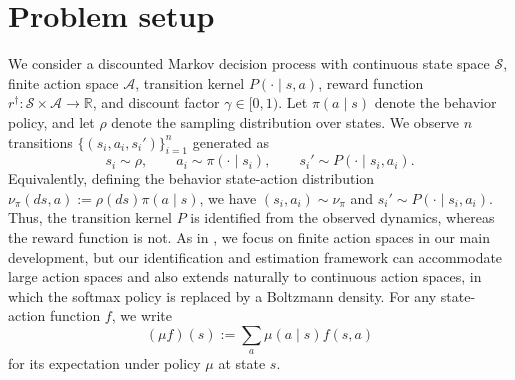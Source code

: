 \documentclass{article}
\newcommand{\1}{\mathbbm{1}}
\newcommand{\calP}{\mathcal{P}}
\newcommand{\calV}{\mathcal{V}}
\begin{document}
 

\section{Problem setup}
\label{sec:background}
We consider a discounted Markov decision process with continuous state space
\(\mathcal S\), finite action space \(\mathcal A\), transition kernel
\(P(\cdot\mid s,a)\), reward function
\(r^\dagger:\mathcal S\times\mathcal A\to\mathbb R\), and discount factor
\(\gamma\in[0,1)\). Let \(\pi(a\mid s)\) denote the behavior policy, and let
\(\rho\) denote the sampling distribution over states. We observe \(n\)
transitions \(\{(s_i,a_i,s_i')\}_{i=1}^n\) generated as
\[
s_i\sim \rho,\qquad
a_i\sim \pi(\cdot\mid s_i),\qquad
s_i'\sim P(\cdot\mid s_i,a_i).
\]
Equivalently, defining the behavior state-action distribution
\(\nu_\pi(ds,a):=\rho(ds)\pi(a\mid s)\), we have \((s_i,a_i)\sim \nu_\pi\)
and \(s_i'\sim P(\cdot\mid s_i,a_i)\). Thus, the transition kernel \(P\) is identified from the observed dynamics,
whereas the reward function is not. As in \citet{geng2020deep}, we focus on finite action spaces in our main
development, but our identification and estimation framework can accommodate
large action spaces and also extends naturally to continuous action spaces, in
which the softmax policy is replaced by a Boltzmann density. For any state-action
function \(f\), we write
\[
(\mu f)(s):=\sum_a \mu(a\mid s)f(s,a)
\]
for its expectation under policy \(\mu\) at state \(s\).
\end{document}
